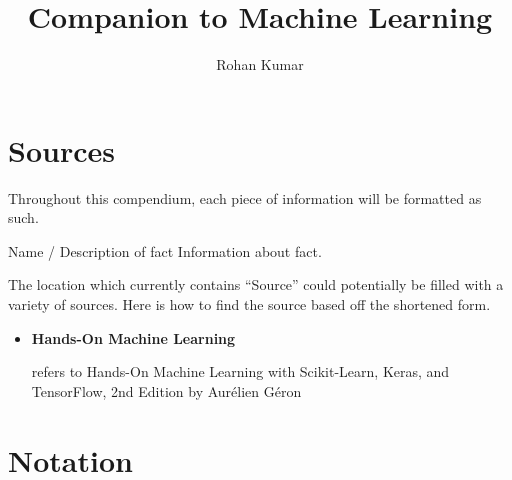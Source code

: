 \documentclass[12pt]{article}
\title{Companion to Machine Learning}
\author{Rohan Kumar}
\date{}
\newenvironment{fact*}[2][]
    {
    \begin{adjustwidth}{1em}{0em}
    \noindent
    \textbf{#2} \hfill #1
    
    \vspace{0.1in}
    \noindent
    \ignorespaces
    } {
    \end{adjustwidth}
    }
\begin{document}
\maketitle
\newpage
\tableofcontents
\newpage

\section*{Sources}
    Throughout this compendium, each piece of information will be formatted as such.
    
    \vspace{0.1in}
    \begin{fact*}[Source]{Name / Description of fact}
        Information about fact.
    \end{fact*}
    \vspace{0.3in}
    
    \noindent The location which currently contains ``Source'' could potentially be filled with a variety of sources.
    Here is how to find the source based off the shortened form.
    
    \begin{itemize}
        \item \hypertarget{homl}{\textbf{Hands-On Machine Learning}} refers to Hands-On Machine Learning with
        Scikit-Learn, Keras, and TensorFlow, 2nd Edition by Aurélien Géron
    \end{itemize}

\newpage

\section{Notation}
\end{document}

